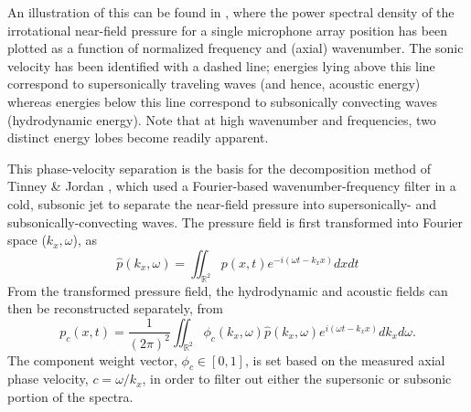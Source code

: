 An illustration of this can be found in , where the power spectral density of the irrotational near-field pressure for a single microphone array position has been plotted as a function of normalized frequency and (axial) wavenumber.
The sonic velocity has been identified with a dashed line; energies lying above this line correspond to supersonically traveling waves (and hence, acoustic energy) whereas energies below this line correspond to subsonically convecting waves (hydrodynamic energy).
Note that at high wavenumber and frequencies, two distinct energy lobes become readily apparent.

This phase-velocity separation is the basis for the decomposition method of Tinney \& Jordan \citep{Tinney2008}, which used a Fourier-based wavenumber-frequency filter in a cold, subsonic jet to separate the near-field pressure into supersonically- and subsonically-convecting waves.
The pressure field is first transformed into Fourier space ($k_x,\omega$), as
\begin{equation}
	\hat{p} \left( k_x , \omega \right) = \iint_{\mathbb{R}^2} p(x,t)e^{-i(\omega t - k_x x)}dxdt
\end{equation}
From the transformed pressure field, the hydrodynamic and acoustic fields can then be reconstructed separately, from
\begin{equation}
	p_c (x,t) = \frac{1}{(2 \pi)^2} \iint_{\mathbb{R}^2} \phi_c (k_x,\omega) \hat{p} (k_x,\omega)e^{i(\omega t - k_x x)}dk_x d\omega .
	\label{eq:fourier_filter}
\end{equation}
The component weight vector, $\phi_c \in [0,1]$, is set based on the measured axial phase velocity, $c = \omega / k_x$, in order to filter out either the supersonic or subsonic portion of the spectra. 
 
